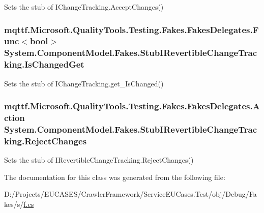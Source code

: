 Sets the stub of I\-Change\-Tracking.\-Accept\-Changes()

\hypertarget{class_system_1_1_component_model_1_1_fakes_1_1_stub_i_revertible_change_tracking_a7529beee31ead78982801f7a51120fbc}{
\subsubsection[{Is\-Changed\-Get}]{\setlength{\rightskip}{0pt plus 5cm}mqttf.\-Microsoft.\-Quality\-Tools.\-Testing.\-Fakes.\-Fakes\-Delegates.\-Func$<$bool$>$ System.\-Component\-Model.\-Fakes.\-Stub\-I\-Revertible\-Change\-Tracking.\-Is\-Changed\-Get}}\label{class_system_1_1_component_model_1_1_fakes_1_1_stub_i_revertible_change_tracking_a7529beee31ead78982801f7a51120fbc}


Sets the stub of I\-Change\-Tracking.\-get\-\_\-\-Is\-Changed()

\hypertarget{class_system_1_1_component_model_1_1_fakes_1_1_stub_i_revertible_change_tracking_a4ead3e64766ded73ab8e1eed8c3c489b}{
\subsubsection[{Reject\-Changes}]{\setlength{\rightskip}{0pt plus 5cm}mqttf.\-Microsoft.\-Quality\-Tools.\-Testing.\-Fakes.\-Fakes\-Delegates.\-Action System.\-Component\-Model.\-Fakes.\-Stub\-I\-Revertible\-Change\-Tracking.\-Reject\-Changes}}\label{class_system_1_1_component_model_1_1_fakes_1_1_stub_i_revertible_change_tracking_a4ead3e64766ded73ab8e1eed8c3c489b}


Sets the stub of I\-Revertible\-Change\-Tracking.\-Reject\-Changes()



The documentation for this class was generated from the following file\-:\begin{DoxyCompactItemize}
\item 
D\-:/\-Projects/\-E\-U\-C\-A\-S\-E\-S/\-Crawler\-Framework/\-Service\-E\-U\-Cases.\-Test/obj/\-Debug/\-Fakes/s/\hyperlink{s_2f_8cs}{f.\-cs}\end{DoxyCompactItemize}
